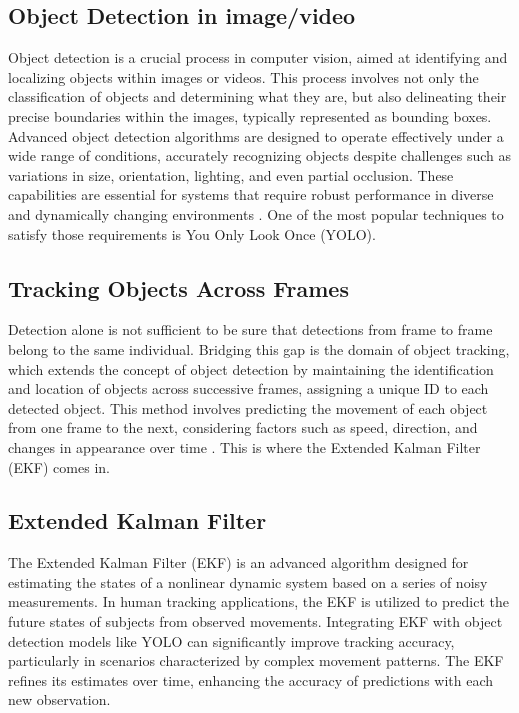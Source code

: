 \documentclass{article}
\begin{document}
\subsection{Object Detection in image/video} 
Object detection is a crucial process in computer vision, aimed at identifying and localizing objects within images or videos. This process involves not only the classification of objects and determining what they are, but also delineating their precise boundaries within the images, typically represented as bounding boxes. Advanced object detection algorithms are designed to operate effectively under a wide range of conditions, accurately recognizing objects despite challenges such as variations in size, orientation, lighting, and even partial occlusion. These capabilities are essential for systems that require robust performance in diverse and dynamically changing environments \cite{visoai2021object}. One of the most popular techniques to satisfy those requirements is You Only Look Once (YOLO).


\subsection{Tracking Objects Across Frames}Detection alone is not sufficient to be sure that detections from frame to frame belong to the same individual. Bridging this gap is the domain of object tracking, which extends the concept of object detection by maintaining the identification and location of objects across successive frames, assigning a unique ID to each detected object. This method involves predicting the movement of each object from one frame to the next, considering factors such as speed, direction, and changes in appearance over time \cite{learnopencvYOLOv8Tracking}. This is where the Extended Kalman Filter (EKF) comes in.

\subsection{Extended Kalman Filter}The Extended Kalman Filter (EKF) is an advanced algorithm designed for estimating the states of a nonlinear dynamic system based on a series of noisy measurements. In human tracking applications, the EKF is utilized to predict the future states of subjects from observed movements. Integrating EKF with object detection models like YOLO can significantly improve tracking accuracy, particularly in scenarios characterized by complex movement patterns. The EKF refines its estimates over time, enhancing the accuracy of predictions with each new observation.\\
\end{document}

